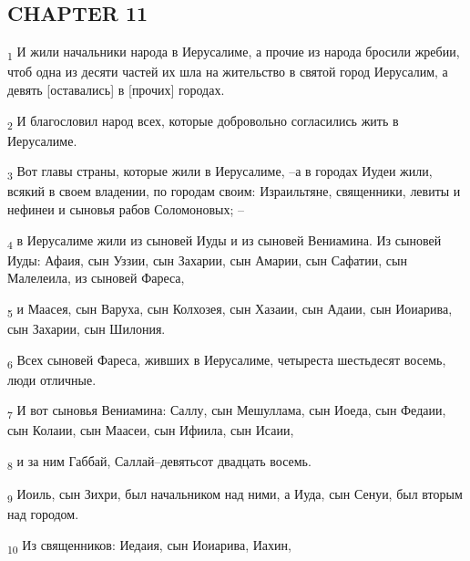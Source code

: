 \subsection{CHAPTER 11}
\begin{tcolorbox}
\textsubscript{1} И жили начальники народа в Иерусалиме, а прочие из народа бросили жребии, чтоб одна из десяти частей их шла на жительство в святой город Иерусалим, а девять [оставались] в [прочих] городах.
\end{tcolorbox}
\begin{tcolorbox}
\textsubscript{2} И благословил народ всех, которые добровольно согласились жить в Иерусалиме.
\end{tcolorbox}
\begin{tcolorbox}
\textsubscript{3} Вот главы страны, которые жили в Иерусалиме, --а в городах Иудеи жили, всякий в своем владении, по городам своим: Израильтяне, священники, левиты и нефинеи и сыновья рабов Соломоновых; --
\end{tcolorbox}
\begin{tcolorbox}
\textsubscript{4} в Иерусалиме жили из сыновей Иуды и из сыновей Вениамина. Из сыновей Иуды: Афаия, сын Уззии, сын Захарии, сын Амарии, сын Сафатии, сын Малелеила, из сыновей Фареса,
\end{tcolorbox}
\begin{tcolorbox}
\textsubscript{5} и Маасея, сын Варуха, сын Колхозея, сын Хазаии, сын Адаии, сын Иоиарива, сын Захарии, сын Шилония.
\end{tcolorbox}
\begin{tcolorbox}
\textsubscript{6} Всех сыновей Фареса, живших в Иерусалиме, четыреста шестьдесят восемь, люди отличные.
\end{tcolorbox}
\begin{tcolorbox}
\textsubscript{7} И вот сыновья Вениамина: Саллу, сын Мешуллама, сын Иоеда, сын Федаии, сын Колаии, сын Маасеи, сын Ифиила, сын Исаии,
\end{tcolorbox}
\begin{tcolorbox}
\textsubscript{8} и за ним Габбай, Саллай--девятьсот двадцать восемь.
\end{tcolorbox}
\begin{tcolorbox}
\textsubscript{9} Иоиль, сын Зихри, был начальником над ними, а Иуда, сын Сенуи, был вторым над городом.
\end{tcolorbox}
\begin{tcolorbox}
\textsubscript{10} Из священников: Иедаия, сын Иоиарива, Иахин,
\end{tcolorbox}
